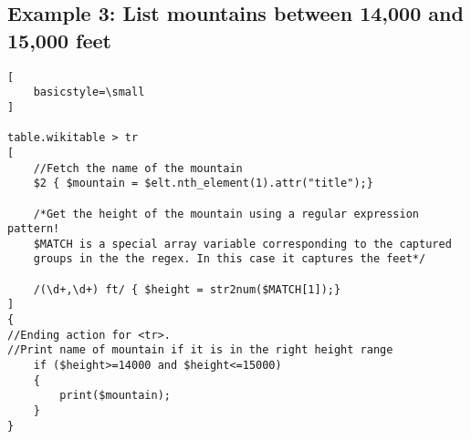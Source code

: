 \documentclass[12pt]{article}
\begin{document}
\subsection*{Example 3: List mountains between 14,000 and 15,000 feet}

\begin{lstlisting}[
    basicstyle=\small
]

table.wikitable > tr
[
	//Fetch the name of the mountain
	$2 { $mountain = $elt.nth_element(1).attr("title");}

	/*Get the height of the mountain using a regular expression pattern! 
	$MATCH is a special array variable corresponding to the captured 
	groups in the the regex. In this case it captures the feet*/
	
	/(\d+,\d+) ft/ { $height = str2num($MATCH[1]);}
]
{
//Ending action for <tr>.
//Print name of mountain if it is in the right height range
	if ($height>=14000 and $height<=15000)
	{
		print($mountain);
	}
}

\end{lstlisting}
\end{document}
